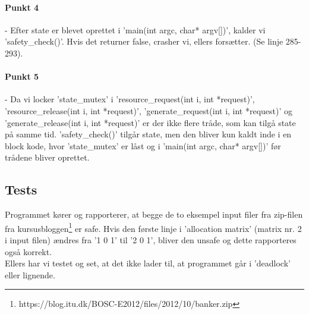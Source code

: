 \paragraph{Punkt 4} - Efter state er blevet oprettet i 'main(int argc, char* argv[])', kalder vi 'safety\_check()'. Hvis det returner false, crasher vi, ellers forsætter. (Se linje 285-293).
\paragraph{Punkt 5} - Da vi locker 'state\_mutex' i 'resource\_request(int i, int *request)', 'resource\_release(int i, int *request)', 'generate\_request(int i, int *request)' og 'generate\_release(int i, int *request)' er der ikke flere tråde, som kan tilgå state på samme tid. 'safety\_check()' tilgår state, men den bliver kun kaldt inde i en block kode, hvor 'state\_mutex' er låst og i 'main(int argc, char* argv[])' før trådene bliver oprettet.

\subsection{Tests}
\label{O4_Tests}
Programmet kører og rapporterer, at begge de to eksempel input filer fra zip-filen fra kursusbloggen\footnote{https://blog.itu.dk/BOSC-E2012/files/2012/10/banker.zip} er safe. Hvis den første linje i 'allocation matrix' (matrix nr. 2 i  input filen) ændres fra '1 0 1' til '2 0 1', bliver den unsafe og dette rapporteres også korrekt.
\\Ellers har vi testet og set, at det ikke lader til, at programmet går i 'deadlock' eller lignende.
